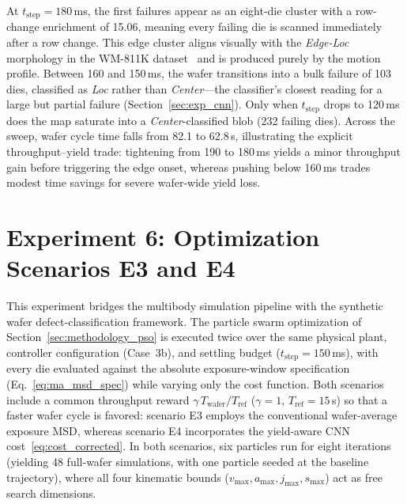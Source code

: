 At $t_{\mathrm{step}} = 180$\,ms, the first failures appear as an eight-die cluster with a row-change enrichment of 15.06, meaning every failing die is scanned immediately after a row change. This edge cluster aligns visually with the \textit{Edge-Loc} morphology in the WM-811K dataset~\cite{Wu2015_WM811K} and is produced purely by the motion profile. Between 160 and 150\,ms, the wafer transitions into a bulk failure of 103 dies, classified as \textit{Loc} rather than \textit{Center}---the classifier's closest reading for a large but partial failure (Section~\ref{sec:exp_cnn}). Only when $t_{\mathrm{step}}$ drops to 120\,ms does the map saturate into a \textit{Center}-classified blob (232 failing dies). Across the sweep, wafer cycle time falls from 82.1 to 62.8\,s, illustrating the explicit throughput--yield trade: tightening from 190 to 180\,ms yields a minor throughput gain before triggering the edge onset, whereas pushing below 160\,ms trades modest time savings for severe wafer-wide yield loss.

\section{Experiment 6: Optimization Scenarios E3 and E4}\label{sec:exp_pso}

This experiment bridges the multibody simulation pipeline with the synthetic wafer defect-classification framework. The particle swarm optimization of Section~\ref{sec:methodology_pso} is executed twice over the same physical plant, controller configuration (Case~3b), and settling budget ($t_{\mathrm{step}} = 150$\,ms), with every die evaluated against the absolute exposure-window specification (Eq.~\eqref{eq:ma_msd_spec}) while varying only the cost function. Both scenarios include a common throughput reward $\gamma\, T_{\mathrm{wafer}}/T_{\mathrm{ref}}$ ($\gamma = 1$, $T_{\mathrm{ref}} = 15$\,s) so that a faster wafer cycle is favored: scenario E3 employs the conventional wafer-average exposure MSD, whereas scenario E4 incorporates the yield-aware CNN cost~\eqref{eq:cost_corrected}. In both scenarios, six particles run for eight iterations (yielding 48 full-wafer simulations, with one particle seeded at the baseline trajectory), where all four kinematic bounds ($v_{\max}, a_{\max}, j_{\max}, s_{\max}$) act as free search dimensions.

